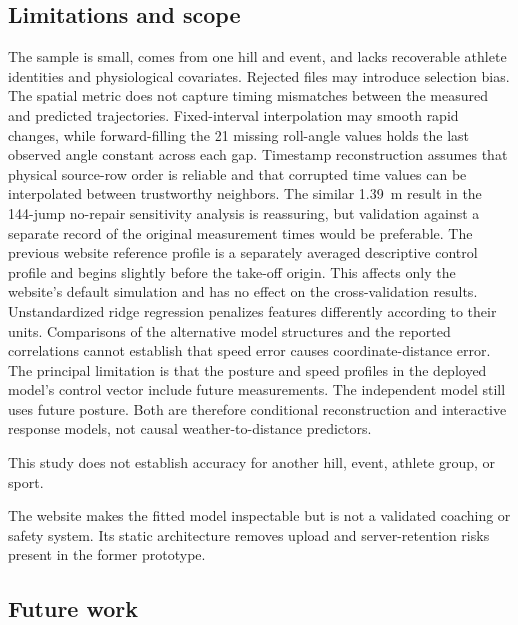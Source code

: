 \documentclass[11pt,twoside,a4paper]{article}
\begin{document}
\subsection{Limitations and scope}

The sample is small, comes from one hill and event, and lacks recoverable athlete identities and physiological covariates. Rejected files may introduce selection bias. The spatial metric does not capture timing mismatches between the measured and predicted trajectories. Fixed-interval interpolation may smooth rapid changes, while forward-filling the 21 missing roll-angle values holds the last observed angle constant across each gap. Timestamp reconstruction assumes that physical source-row order is reliable and that corrupted time values can be interpolated between trustworthy neighbors. The similar 1.39~m result in the 144-jump no-repair sensitivity analysis is reassuring, but validation against a separate record of the original measurement times would be preferable. The previous website reference profile is a separately averaged descriptive control profile and begins slightly before the take-off origin. This affects only the website's default simulation and has no effect on the cross-validation results. Unstandardized ridge regression penalizes features differently according to their units. Comparisons of the alternative model structures and the reported correlations cannot establish that speed error causes coordinate-distance error. The principal limitation is that the posture and speed profiles in the deployed model's control vector include future measurements. The independent model still uses future posture. Both are therefore conditional reconstruction and interactive response models, not causal weather-to-distance predictors.


This study does not establish accuracy for another hill, event, athlete group, or sport.

The website makes the fitted model inspectable but is not a validated coaching or safety system. Its static architecture removes upload and server-retention risks present in the former prototype.

\subsection{Future work}
\end{document}
